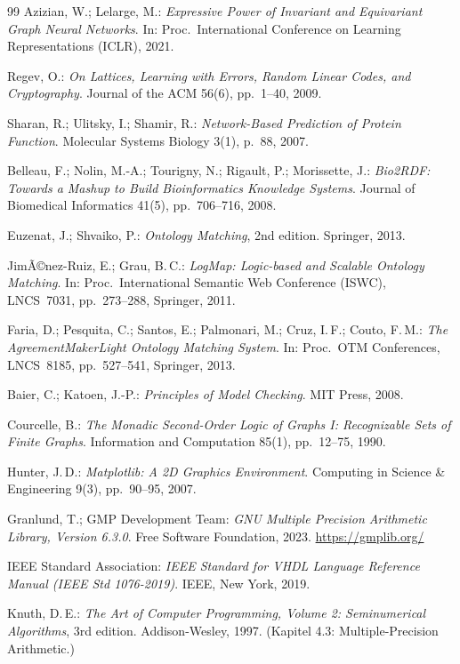 ﻿\documentclass[a4paper,12pt]{article}
\theoremstyle{definition}
\begin{document}
\begin{thebibliography}{99}
Azizian, W.; Lelarge, M.:
\textit{Expressive Power of Invariant and Equivariant Graph Neural Networks}.
In: Proc.\ International Conference on Learning Representations (ICLR), 2021.

Regev, O.:
\textit{On Lattices, Learning with Errors, Random Linear Codes, and Cryptography}.
Journal of the ACM 56(6), pp.\ 1--40, 2009.

Sharan, R.; Ulitsky, I.; Shamir, R.:
\textit{Network-Based Prediction of Protein Function}.
Molecular Systems Biology 3(1), p.\ 88, 2007.

Belleau, F.; Nolin, M.-A.; Tourigny, N.; Rigault, P.; Morissette, J.:
\textit{Bio2RDF: Towards a Mashup to Build Bioinformatics Knowledge Systems}.
Journal of Biomedical Informatics 41(5), pp.\ 706--716, 2008.

Euzenat, J.; Shvaiko, P.:
\textit{Ontology Matching}, 2nd edition. Springer, 2013.

JimÃ©nez-Ruiz, E.; Grau, B.\,C.:
\textit{LogMap: Logic-based and Scalable Ontology Matching}.
In: Proc.\ International Semantic Web Conference (ISWC), LNCS~7031,
pp.\ 273--288, Springer, 2011.

Faria, D.; Pesquita, C.; Santos, E.; Palmonari, M.; Cruz, I.\,F.; Couto, F.\,M.:
\textit{The AgreementMakerLight Ontology Matching System}.
In: Proc.\ OTM Conferences, LNCS~8185, pp.\ 527--541, Springer, 2013.

Baier, C.; Katoen, J.-P.:
\textit{Principles of Model Checking}.
MIT Press, 2008.

Courcelle, B.:
\textit{The Monadic Second-Order Logic of Graphs I: Recognizable Sets of Finite Graphs}.
Information and Computation 85(1), pp.\ 12--75, 1990.

Hunter, J.\,D.:
\textit{Matplotlib: A 2D Graphics Environment}.
Computing in Science \& Engineering 9(3), pp.\ 90--95, 2007.

Granlund, T.; GMP Development Team:
\textit{GNU Multiple Precision Arithmetic Library, Version 6.3.0}.
Free Software Foundation, 2023.
\url{https://gmplib.org/}

IEEE Standard Association:
\textit{IEEE Standard for VHDL Language Reference Manual (IEEE Std 1076-2019)}.
IEEE, New York, 2019.

Knuth, D.\,E.:
\textit{The Art of Computer Programming, Volume 2: Seminumerical Algorithms},
3rd edition. Addison-Wesley, 1997. (Kapitel 4.3: Multiple-Precision Arithmetic.)

\end{thebibliography}
\end{document}
